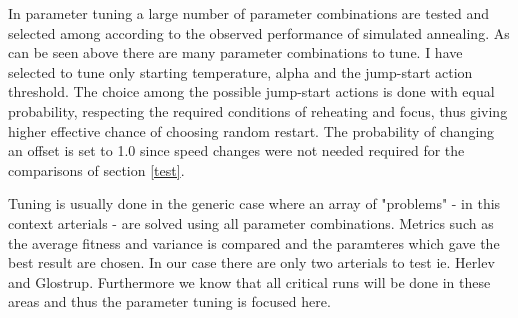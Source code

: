 In parameter tuning a large number of parameter combinations are tested and selected among according to the observed performance of simulated annealing. As can be seen above there are many parameter combinations to tune. I have selected to tune only starting temperature, alpha and the jump-start action threshold. The choice among the possible jump-start actions is done with equal probability, respecting the required conditions of reheating and focus, thus giving higher effective chance of choosing random restart. The probability of changing an offset is set to 1.0 since speed changes were not needed required for the comparisons of section \ref{test}.

Tuning is usually done in the generic case where an array of "problems" - in this context arterials - are solved using all parameter combinations. Metrics such as the average fitness and variance is compared and the paramteres which gave the best result are chosen. In our case there are only two arterials to test ie. Herlev and Glostrup. Furthermore we know that all critical runs will be done in these areas and thus the parameter tuning is focused here.

